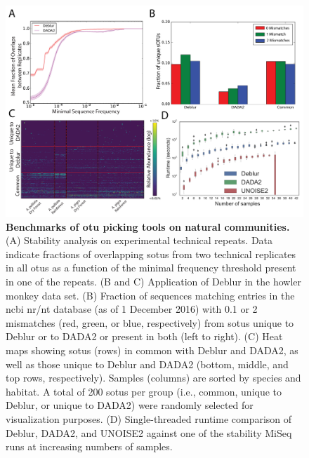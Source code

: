 \begin{figure}[htbp]
\includegraphics[width=\columnwidth]{chapter_otupicking_figures/deblurBench.pdf}
\caption[Benchmarks of \gls{otu} picking tools on natural communities]{\textbf{Benchmarks of \gls{otu} picking tools on natural communities.}
(A) Stability analysis on experimental technical repeats. Data indicate fractions
of overlapping s\gls{otu}s from two technical replicates in all \gls{otu}s as a
function of the minimal frequency threshold present in one of the repeats.
(B and C) Application of Deblur in the howler monkey data set. (B) Fraction of
sequences matching entries in the \gls{ncbi} nr/nt database
(as of 1 December 2016) with 0.1 or 2 mismatches (red, green, or blue, respectively)
from s\gls{otu}s unique to Deblur or to DADA2 or present in both (left to right).
(C) Heat maps showing s\gls{otu}s (rows) in common with Deblur and DADA2, as well
as those unique to Deblur and DADA2 (bottom, middle, and top rows, respectively).
Samples (columns) are sorted by species and habitat. A total of 200 s\gls{otu}s per group
(i.e., common, unique to Deblur, or unique to DADA2) were randomly selected for
visualization purposes. (D) Single-threaded runtime comparison of Deblur, DADA2,
and UNOISE2 against one of the stability MiSeq runs at increasing numbers of samples.}
\label{figure_deblur_bench}
\end{figure}
